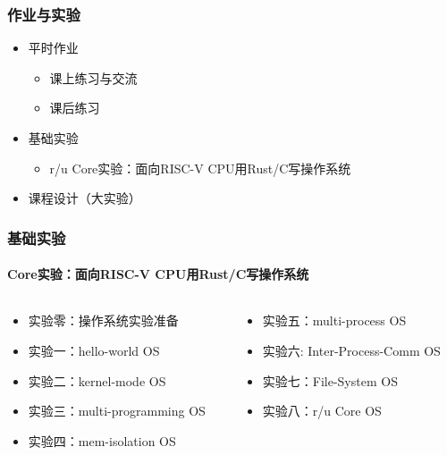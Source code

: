     \begin{frame}
        \frametitle{作业与实验}
        \begin{itemize}
            \item 平时作业
        \begin{itemize}
    		\item 课上练习与交流
	    	\item 课后练习
        \end{itemize} %

            \item 基础实验
    \begin{itemize}
		\item r/u Core实验：面向RISC-V CPU用Rust/C写操作系统
    \end{itemize}
            \item 课程设计（大实验）
        \end{itemize}
\end{frame}

\begin{frame}
\frametitle{基础实验}
\framesubtitle{Core实验：面向RISC-V CPU用Rust/C写操作系统} %
\begin{columns}
	
\begin{column}{0.5\textwidth}
\begin{itemize}
		\item 实验零：操作系统实验准备
		\item 实验一：hello-world OS
		\item 实验二：kernel-mode OS
		\item 实验三：multi-programming OS
		\item 实验四：mem-isolation OS
\end{itemize}
\end{column}
 
\begin{column}{0.5\textwidth}
    \begin{itemize}
		\item 实验五：multi-process OS
		\item 实验六: Inter-Process-Comm OS
		\item 实验七：File-System OS
		\item 实验八：r/u Core OS
	\end{itemize}
\end{column}

\end{columns}

\end{frame}



